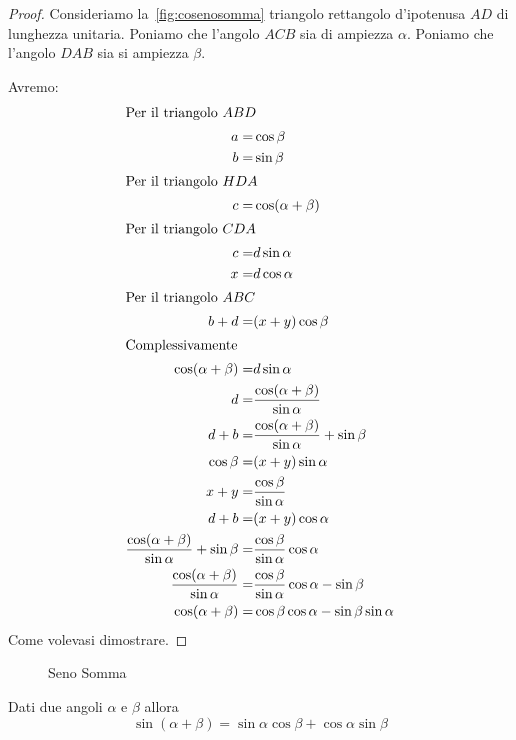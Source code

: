 \begin{proof}
	Consideriamo la~\vref{fig:cosenosomma} triangolo rettangolo d'ipotenusa $AD$ di lunghezza unitaria. Poniamo che l'angolo $ACB$ sia di ampiezza $\alpha$. Poniamo che l'angolo $DAB$ sia si ampiezza $\beta$.

Avremo:\begin{align*}
\intertext{Per il triangolo $ABD$}
a=&\cos\beta\\
b=&\sin\beta\\
\intertext{Per il triangolo $HDA$}
c=&\cos(\alpha+\beta)\\
\intertext{Per il triangolo $CDA$}
c=&d\sin\alpha\\
x=&d\cos\alpha\\
\intertext{Per il triangolo $ABC$}
b+d=&(x+y)\cos\beta\\
\intertext{Complessivamente}
\cos(\alpha+\beta)=&d\sin\alpha\\
d=&\dfrac{\cos(\alpha+\beta)}{\sin\alpha}\\
d+b=&\dfrac{\cos(\alpha+\beta)}{\sin\alpha}+\sin\beta\\
\cos\beta=&(x+y)\sin\alpha\\
x+y=&\dfrac{\cos\beta}{\sin\alpha}\\
d+b=&(x+y)\cos\alpha\\
\dfrac{\cos(\alpha+\beta)}{\sin\alpha}+\sin\beta=&\dfrac{\cos\beta}{\sin\alpha}\cos\alpha\\
\dfrac{\cos(\alpha+\beta)}{\sin\alpha}=&\dfrac{\cos\beta}{\sin\alpha}\cos\alpha-\sin\beta\\
\cos(\alpha+\beta)=&\cos\beta\cos\alpha-\sin\beta\sin\alpha\\
\end{align*}
Come volevasi dimostrare.
\end{proof}
\begin{figure}
	\centering
	
	\caption[Seno somma]{Seno Somma}
	\label{fig:senosomma}
\end{figure}
\begin{thm}\label{thm:senosomma}
	Dati due angoli $\alpha$ e $\beta$ allora
	\[\sin(\alpha+\beta)=\sin\alpha\cos\beta+\cos\alpha\sin\beta\]	
\end{thm}~\cite{Smiley1999}
